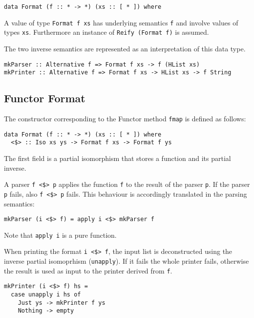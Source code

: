 \documentclass[../Thesis.tex]{subfiles}
\begin{document}
\begin{verbatim}
data Format (f :: * -> *) (xs :: [ * ]) where
\end{verbatim}

A value of type \texttt{Format f xs} has underlying semantics \texttt{f} and involve values of types \texttt{xs}. Furthermore
an instance of \texttt{Reify (Format f)} is assumed.

The two inverse semantics are represented as an interpretation of this data type.
\begin{verbatim}
mkParser :: Alternative f => Format f xs -> f (HList xs)
mkPrinter :: Alternative f => Format f xs -> HList xs -> f String
\end{verbatim}

\subsection{Functor Format}
The constructor corresponding to the Functor method \texttt{fmap} is defined as follows:

\begin{verbatim}
data Format (f :: * -> *) (xs :: [ * ]) where
  <$> :: Iso xs ys -> Format f xs -> Format f ys
\end{verbatim}

The first field is a partial isomorphism that stores a function
and its partial inverse.

A parser \texttt{f <\$> p} applies the function \texttt{f} to the result of the parser \texttt{p}. If the parser \texttt{p} fails, also \texttt{f <\$> p} fails.
This behaviour is accordingly translated in the parsing semantics:

\begin{verbatim}
mkParser (i <$> f) = apply i <$> mkParser f
\end{verbatim}

Note that \texttt{apply i} is a pure function.

When printing the format \texttt{i <\$> f}, the input list is deconstructed using the inverse partial isomoprhism (\texttt{unapply}). If it fails the whole printer fails, otherwise the result is used as input to the printer derived from \texttt{f}.

\begin{verbatim}
mkPrinter (i <$> f) hs = 
  case unapply i hs of
    Just ys -> mkPrinter f ys
    Nothing -> empty
\end{verbatim}
\end{document}

